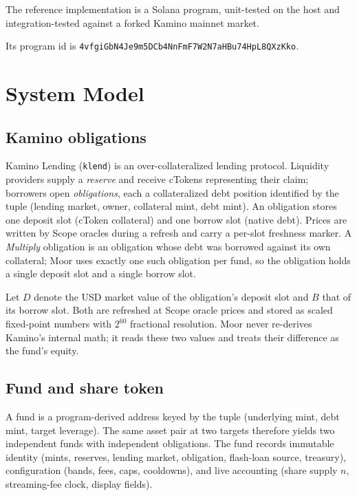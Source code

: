 \documentclass[11pt]{article}
\theoremstyle{remark}
\begin{document}
The reference implementation is a Solana program, unit-tested on the host and
integration-tested against a forked Kamino mainnet market.

\noindent
Its program id is
{\small\texttt{4vfgiGbN4Je9m5\allowbreak DCb4NnFmF7W2N7\allowbreak aHBu74HpL8QXzKko}}.

\section{System Model}
\label{sec:model}

\subsection{Kamino obligations}

Kamino Lending (\texttt{klend}) is an over-collateralized lending protocol. Liquidity providers supply a \emph{reserve} and receive cTokens representing their claim; borrowers open \emph{obligations}, each a collateralized debt position identified by the tuple (lending market, owner, collateral mint, debt mint). An obligation stores one deposit slot (cToken collateral) and one borrow slot (native debt). Prices are written by Scope oracles during a refresh and carry a per-slot freshness marker. A \emph{Multiply} obligation is an obligation whose debt was borrowed against its own collateral; Moor uses exactly one such obligation per fund, so the obligation holds a single deposit slot and a single borrow slot.

Let $D$ denote the USD market value of the obligation's deposit slot and $B$
that of its borrow slot. Both are refreshed at Scope oracle prices and stored
as scaled fixed-point numbers with $2^{60}$ fractional resolution. Moor never
re-derives Kamino's internal math; it reads these two values and treats their
difference as the fund's equity.

\subsection{Fund and share token}

A fund is a program-derived address keyed by the tuple (underlying mint, debt mint, target leverage). The same asset pair at two targets therefore yields two independent funds with independent obligations. The fund records immutable identity (mints, reserves, lending market, obligation, flash-loan source, treasury), configuration (bands, fees, caps, cooldowns), and live accounting (share supply $n$, streaming-fee clock, display fields).
\end{document}
